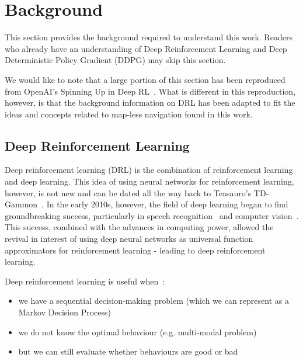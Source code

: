 
\chapter{Background}
\vspace{2em}
This section provides the background required to understand this work. Readers who already have an understanding of Deep Reinforcement Learning and Deep Deterministic Policy Gradient (DDPG) may skip this section.

We would like to note that a large portion of this section has been reproduced from OpenAI's Spinning Up in Deep RL~\cite{SpinningUp2018}. What is different in this reproduction, however, is that the background information on DRL has been adapted to fit the ideas and concepts related to map-less navigation found in this work.

\section{Deep Reinforcement Learning}
Deep reinforcement learning (DRL) is the combination of reinforcement learning and deep learning. This idea of using neural networks for reinforcement learning, however, is not new and can be dated all the way back to Teasauro's TD-Gammon~\cite{tesauro_temporal_nodate}. In the early 2010s, however, the field of deep learning began to find groundbreaking success, particularly in speech recognition~\cite{dahl_context-dependent_2012} and computer vision~\cite{krizhevsky_imagenet_2017}. This success, combined with the advances in computing power, allowed the revival in interest of using deep neural networks as universal function approximators for reinforcement learning - leading to deep reinforcement learning.

Deep reinforcement learning is useful when~\cite{SpinningUp2018}:
\begin{itemize}
\item we have a sequential decision-making problem (which we can represent as a Markov Decision Process)
\item we do not know the optimal behaviour (e.g. multi-modal problem)
\item but we can still evaluate whether behaviours are good or bad
\end{itemize}

